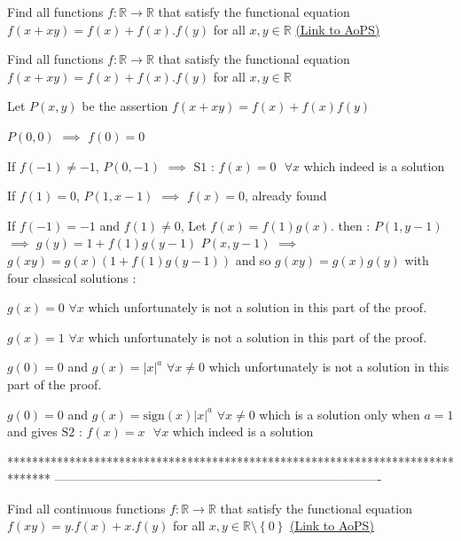 \begin{problem}
	Find  all functions $f : \mathbb{R}\rightarrow \mathbb{R}$ that satisfy the  functional equation 
$ f\left (  x+xy\right )=f\left ( x \right )+ f\left ( x\right ).f\left ( y\right)$  
for all $x,y \in \mathbb{R}$
	\flushright \href{https://artofproblemsolving.com/community/c6h591646}{(Link to AoPS)}
\end{problem}



\begin{solution}
	\begin{tcolorbox}Find  all functions $f : \mathbb{R}\rightarrow \mathbb{R}$ that satisfy the  functional equation 
$ f\left (  x+xy\right )=f\left ( x \right )+ f\left ( x\right ).f\left ( y\right)$  
for all $x,y \in \mathbb{R}$\end{tcolorbox}
Let $P(x,y)$ be the assertion $f(x+xy)=f(x)+f(x)f(y)$

$P(0,0)$ $\implies$ $f(0)=0$

If $f(-1)\ne -1$, $P(0,-1)$ $\implies$ $\boxed{\text{S1 : }f(x)=0\text{   }\forall x}$ which indeed is a solution

If $f(1)=0$, $P(1,x-1)$ $\implies$ $f(x)=0$, already found

If $f(-1)=-1$ and $f(1)\ne 0$, Let $f(x)=f(1)g(x)$. then :
$P(1,y-1)$ $\implies$ $g(y)=1+f(1)g(y-1)$
$P(x,y-1)$ $\implies$ $g(xy)=g(x)(1+f(1)g(y-1))$ and so $g(xy)=g(x)g(y)$ with four classical solutions :

$g(x)=0$ $\forall x$ which unfortunately is not a solution in this part of the proof.

$g(x)=1$ $\forall x$ which unfortunately is not a solution in this part of the proof.

$g(0)=0$ and $g(x)=|x|^a$ $\forall x\ne 0$ which unfortunately is not a solution in this part of the proof.

$g(0)=0$ and $g(x)=\text{sign}(x)|x|^a$ $\forall x\ne 0$ which is a solution only when $a=1$ and gives $\boxed{\text{S2 : }f(x)=x\text{   }\forall x}$ which indeed is a solution
\end{solution}
*******************************************************************************
-------------------------------------------------------------------------------

\begin{problem}
	Find  all continuous functions $f : \mathbb{R}\rightarrow \mathbb{R}$ that satisfy the  functional equation 
$ f\left (  xy\right )=y.f\left ( x \right )+x. f\left ( y\right )$   for all $ x,y\in \mathbb{R}\setminus \left \{ 0 \right \}$
	\flushright \href{https://artofproblemsolving.com/community/c6h591647}{(Link to AoPS)}
\end{problem}



